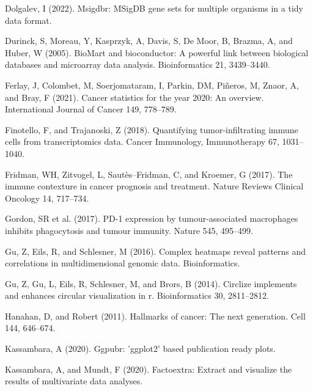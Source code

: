 \documentclass[
  parskip,
  openany]{scrreprt}
\newlength{\cslhangindent}
\newlength{\cslentryspacingunit} %
\newenvironment{CSLReferences}[2] %
 {%
  \setlength{\parindent}{0pt}
  \ifodd #1
  \let\oldpar\par
  \def\par{\hangindent=\cslhangindent\oldpar}
  \fi
  \setlength{\parskip}{#2\cslentryspacingunit}
 }%
 {}
\begin{document}
\begin{CSLReferences}{0}{0}
\leavevmode{}%
Dolgalev, I (2022). Msigdbr: MSigDB gene sets for multiple organisms in
a tidy data format.

\leavevmode{}%
Durinck, S, Moreau, Y, Kasprzyk, A, Davis, S, De Moor, B, Brazma, A, and
Huber, W (2005). BioMart and bioconductor: A powerful link between
biological databases and microarray data analysis. Bioinformatics 21,
3439--3440.

\leavevmode{}%
Ferlay, J, Colombet, M, Soerjomataram, I, Parkin, DM, Piñeros, M, Znaor,
A, and Bray, F (2021). Cancer statistics for the year 2020: An overview.
International Journal of Cancer 149, 778--789.

\leavevmode{}%
Finotello, F, and Trajanoski, Z (2018). Quantifying tumor-infiltrating
immune cells from transcriptomics data. Cancer Immunology, Immunotherapy
67, 1031--1040.

\leavevmode{}%
Fridman, WH, Zitvogel, L, Sautès--Fridman, C, and Kroemer, G (2017). The
immune contexture in cancer prognosis and treatment. Nature Reviews
Clinical Oncology 14, 717--734.

\leavevmode{}%
Gordon, SR et al. (2017). PD-1 expression by tumour-associated
macrophages inhibits phagocytosis and tumour immunity. Nature 545,
495--499.

\leavevmode{}%
Gu, Z, Eils, R, and Schlesner, M (2016). Complex heatmaps reveal
patterns and correlations in multidimensional genomic data.
Bioinformatics.

\leavevmode{}%
Gu, Z, Gu, L, Eils, R, Schlesner, M, and Brors, B (2014). Circlize
implements and enhances circular visualization in r. Bioinformatics 30,
2811--2812.

\leavevmode{}%
Hanahan, D, and Robert (2011). Hallmarks of cancer: The next generation.
Cell 144, 646--674.

\leavevmode{}%
Kassambara, A (2020). Ggpubr: 'ggplot2' based publication ready plots.

\leavevmode{}%
Kassambara, A, and Mundt, F (2020). Factoextra: Extract and visualize
the results of multivariate data analyses.


\end{CSLReferences}
\end{document}
